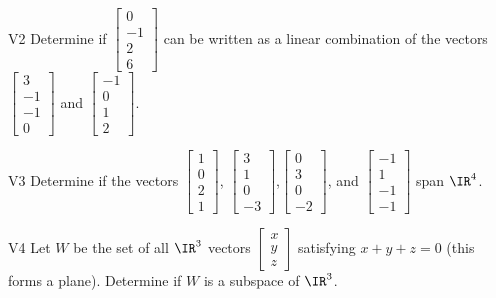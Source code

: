\documentclass{sbgLAexam}
\begin{document}
\begin{problem}{V2}
Determine if $\begin{bmatrix}0 \\ -1 \\ 2 \\ 6 \end{bmatrix}$ can be written as a linear combination of the vectors $\begin{bmatrix} 3 \\ -1 \\ -1 \\ 0 \end{bmatrix}$ and $\begin{bmatrix} -1 \\ 0 \\ 1 \\ 2 \end{bmatrix}$.
\end{problem}

\begin{problem}{V3}
Determine if the vectors $\begin{bmatrix} 1 \\ 0 \\ 2 \\1 \end{bmatrix}$, $\begin{bmatrix} 3 \\ 1 \\ 0 \\ -3 \end{bmatrix}$,$\begin{bmatrix} 0 \\ 3 \\ 0 \\ -2 \end{bmatrix}$, and $\begin{bmatrix}-1 \\ 1 \\ -1 \\ -1 \end{bmatrix}$ span $\IR^4$.
\end{problem}

\begin{problem}{V4} Let \(W\) be the set of all \(\IR^3\) vectors
\(\begin{bmatrix} x \\ y \\ z \end{bmatrix}\) satisfying \(x+y+z=0\) (this forms a plane).
Determine if \(W\) is a subspace of \(\IR^3\).
\end{problem}
\end{document}
